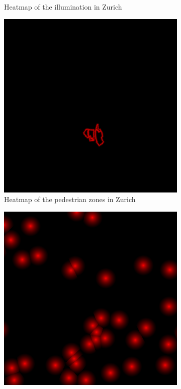 \documentclass[letterpaper]{article}
\begin{document}
\begin{figure}[H]
\begin{subfigure}[t]{.45\columnwidth}
        \caption[width=.9\linewidth]{Heatmap of the illumination in Zurich}
    \end{subfigure}\vspace{1mm}
    \begin{subfigure}[t]{.45\columnwidth}
        \centering
        \includegraphics[width=\linewidth]{images/results/pedestrian_zone_heatmap_70.png}
        \caption[width=.9\linewidth]{Heatmap of the pedestrian zones in Zurich}
    \end{subfigure}\hspace{0.05\columnwidth}
    \begin{subfigure}[t]{.45\columnwidth}
        \centering
        \includegraphics[width=\linewidth]{images/results/sighting_point_heatmap_500.png}

\end{subfigure}
\end{figure}
\end{document}
